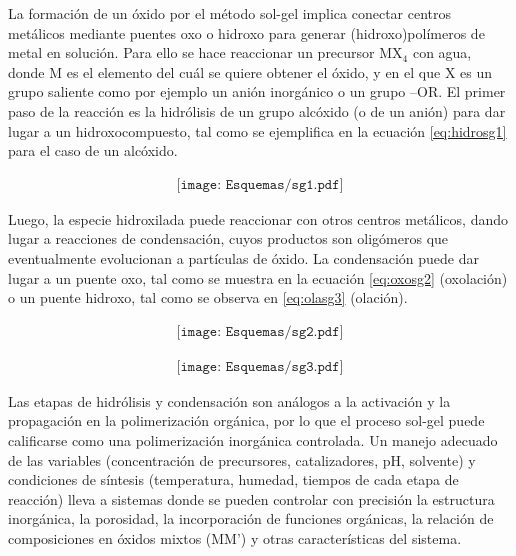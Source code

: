 	 La formación de un óxido por el método sol-gel implica conectar centros metálicos mediante puentes oxo o hidroxo para generar (hidroxo)polímeros de metal en solución. Para ello se hace reaccionar un precursor MX$_4$ con agua, donde M es el elemento del cuál se quiere obtener el óxido, y en el que X es un grupo saliente como por ejemplo un anión inorgánico o un grupo –OR. El primer paso de la reacción es la hidrólisis de un grupo alcóxido (o de un anión) para dar lugar a un hidroxocompuesto, tal como se ejemplifica en la ecuación \ref{eq:hidrosg1} para el caso de un alcóxido.
			
			 \begin{equation}
 				\begin{aligned}
 				\texttt{[image: Esquemas/sg1.pdf]}
 				\end{aligned}
 				\label{eq:hidrosg1}
 	 			\end{equation}

    	Luego, la especie hidroxilada puede reaccionar con otros centros metálicos, dando lugar a reacciones de condensación, cuyos productos son oligómeros que eventualmente evolucionan a partículas de óxido. La condensación puede dar lugar a un puente oxo, tal como se muestra en la ecuación \ref{eq:oxosg2} (oxolación) o un puente hidroxo, tal como se observa en \ref{eq:olasg3} (olación). 

			\begin{equation}
		    	\begin{aligned}
 	 	 		\texttt{[image: Esquemas/sg2.pdf]}
 	 	 		\end{aligned}
 	 	 		\label{eq:oxosg2}
 	 	 		\end{equation}

			\begin{equation}
 	 	 		\begin{aligned}
 	 	 		\texttt{[image: Esquemas/sg3.pdf]}
 	 	 		\label{eq:olasg3}
 	 	 		\end{aligned}
 	 	 		\end{equation}

	 Las etapas de hidrólisis y condensación son análogos a la activación y la propagación en la polimerización orgánica, por lo que el proceso sol-gel puede calificarse como una polimerización inorgánica controlada. Un manejo adecuado de las variables (concentración de precursores, catalizadores, pH, solvente) y condiciones de síntesis (temperatura, humedad, tiempos de cada etapa de reacción) lleva a sistemas donde se pueden controlar con precisión  la estructura inorgánica, la porosidad, la incorporación de funciones orgánicas, la relación de composiciones en óxidos mixtos (MM') y otras características del sistema.

